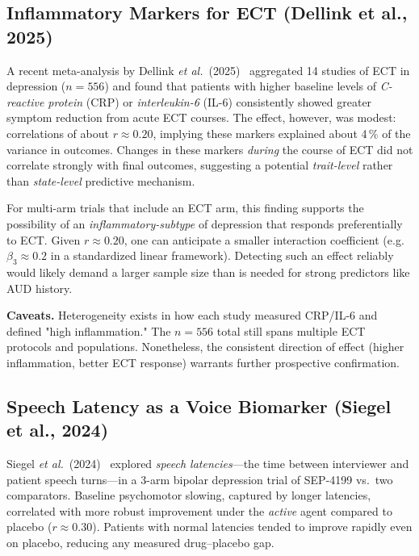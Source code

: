 \documentclass[11pt]{article}
\begin{document}
\subsection{Inflammatory Markers for ECT (Dellink et al., 2025)}

A recent meta-analysis by Dellink \textit{et al.}~(2025)~\cite{dellink2025} aggregated 14 studies of ECT in depression ($n\!=\!556$) and found that patients with higher baseline levels of \emph{C-reactive protein} (CRP) or \emph{interleukin-6} (IL-6) consistently showed greater symptom reduction from acute ECT courses. The effect, however, was modest: correlations of about $r\approx 0.20$, implying these markers explained about 4\,\% of the variance in outcomes. Changes in these markers \emph{during} the course of ECT did not correlate strongly with final outcomes, suggesting a potential \emph{trait-level} rather than \emph{state-level} predictive mechanism.

For multi-arm trials that include an ECT arm, this finding supports the possibility of an \emph{inflammatory-subtype} of depression that responds preferentially to ECT. Given $r\approx 0.20$, one can anticipate a smaller interaction coefficient (e.g.\ $\beta_{3}\approx 0.2$ in a standardized linear framework). Detecting such an effect reliably would likely demand a larger sample size than is needed for strong predictors like AUD history.

\vspace{1ex}
\noindent
\textbf{Caveats.}
Heterogeneity exists in how each study measured CRP/IL-6 and defined "high inflammation." The $n=556$ total still spans multiple ECT protocols and populations. Nonetheless, the consistent direction of effect (higher inflammation, better ECT response) warrants further prospective confirmation.

\subsection{Speech Latency as a Voice Biomarker (Siegel et al., 2024)}

Siegel \textit{et al.}~(2024)~\cite{siegel2024} explored \emph{speech latencies}---the time between interviewer and patient speech turns---in a 3-arm bipolar depression trial of SEP-4199 vs.\ two comparators. Baseline psychomotor slowing, captured by longer latencies, correlated with more robust improvement under the \emph{active} agent compared to placebo ($r\approx 0.30$). Patients with normal latencies tended to improve rapidly even on placebo, reducing any measured drug--placebo gap.
\end{document}
